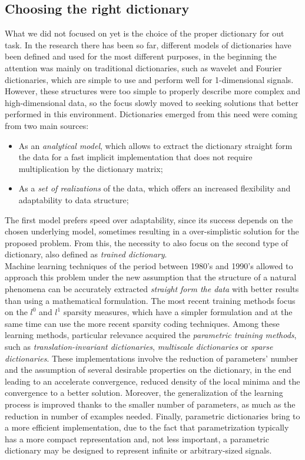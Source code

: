 \subsection{Choosing the right dictionary}
 What we did not focused on yet is the choice of the proper dictionary for out task. In the research there has been so far, different models of dictionaries have been defined and used for the most different purposes, in the beginning the attention was mainly on traditional dictionaries, such as wavelet and Fourier dictionaries, which are simple to use and perform well for 1-dimensional signals. However, these structures were too simple to properly describe more complex and high-dimensional data, so the focus slowly moved to seeking solutions that better performed in this environment. Dictionaries emerged from this need were coming from two main sources:
 \begin{itemize}
 \item As an \textit{analytical model}, which allows to extract the dictionary straight form the data for a fast implicit implementation that does not require multiplication by the dictionary matrix;
 \item As a \textit{set of realizations} of the data, which offers an increased flexibility and adaptability to data structure;
\end{itemize}
The first model prefers speed over adaptability, since its success depends on the chosen underlying model, sometimes resulting in a over-simplistic solution for the proposed problem. From this, the necessity to also focus on the second type of dictionary, also defined as \textit{trained dictionary}.\\
Machine learning techniques of the period between 1980's and 1990's allowed to approach this problem under the new assumption that the structure of a natural phenomena can be accurately extracted \textit{straight form the data} with better results than using a mathematical formulation. The most recent training methods focus on the $l^0$ and $l^1$ sparsity measures, which have a simpler formulation and at the same time can use the more recent sparsity coding techniques. \cite{Gorodnitsky1997} \cite{Pati1993}
Among these learning methods, particular relevance acquired the \textit{parametric training methods}, such as \textit{translation-invariant dictionaries}, \textit{multiscale dictionaries} or \textit{sparse dictionaries}. These implementations involve the reduction of parameters' number and the assumption of several desirable properties on the dictionary, in the end leading to an accelerate convergence, reduced density of the local minima and the convergence to a better solution. Moreover, the generalization of the learning process is improved thanks to the smaller number of parameters, as much as the reduction in number of examples needed. Finally, parametric dictionaries bring to a more efficient implementation, due to the fact that parametrization typically has a more compact representation and, not less important, a parametric dictionary may be designed to represent infinite or arbitrary-sized signals. \cite{Rubinstein2010}

